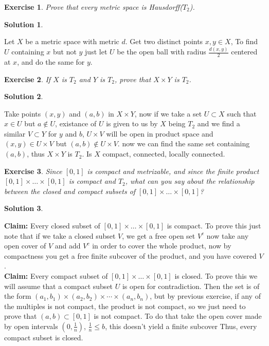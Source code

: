 \documentclass[11pt,a4paper]{article}
\newtheorem{Ex}{Exercise}
\newtheorem{Sol}{Solution}
\begin{document}
\begin{Ex}
	Prove that every metric space is Hausdorff($T_2$).
\end{Ex}
\begin{Sol}\end{Sol}
\noindent Let $X$ be a metric space with metric $d$. Get two distinct points $x,y \in X$, To find $U$ containing $x$ but not $y$ just let $U$ be the open ball with radius $\frac{d(x,y)}{2}$ centered at $x$, and do the same for $y$. 

\begin{Ex}
	If $X$ is $T_2$ and $Y$ is $T_2$, prove that $X \times Y$ is $T_2$.
\end{Ex}
\begin{Sol}\end{Sol}
\noindent Take points $(x,y)$ and $(a,b)$ in $X \times Y$, now if we take a set $U \subset X$ such that $x \in U$ but $a \not \in U$, existance of $U$ is given to us by $X$ being $T_2$ and we find a similar $V \subset Y$ for $y$ and $b$, $U \times V$ will be open in product space and $(x,y) \in U \times V$ but $(a,b) \not \in U \times V$. now we can find the same set containing $(a,b)$, thus $X \times Y$ is $T_2$. Is $X$ compact, connected, locally connected.

\begin{Ex}
	Since $[0,1]$ is compact and metrizable, and since the finite product $[0,1] \times \dots \times [0,1]$ is compact and $T_2$, what can you say about the relationship between the closed and compact subsets of $[0,1] \times \dots \times [0,1]$?   
\end{Ex}

\begin{Sol}\end{Sol}
\noindent \textbf{Claim: }Every closed subset of $[0,1] \times \dots \times [0,1]$ is compact. To prove this just note that if we take a closed subset $V$, we get a free open set $V^c$ now take any open cover of $V$ and add $V^c$ in order to cover the whole product, now by compactness you get a free finite subcover of the product, and you have covered $V$. \\
\textbf{Claim: }Every compact subset of $[0,1] \times \dots \times [0,1]$ is closed. To prove this we will assume that a compact subset $U$ is open for contradiction. Then the set is of the form $(a_1,b_1) \times (a_2,b_2) \times \cdots \times (a_n,b_n)$, but by previous exercise, if any of the multiples is not compact, the product is not compact, so we just need to prove that $(a,b) \subset [0,1]$ is not compact. To do that take the open cover made by open intervals $(0,\frac{1}{n})$, $\frac{1}{n}\le b$, this doesn't yield a finite subcover Thus, every compact subset is closed.
\end{document}
